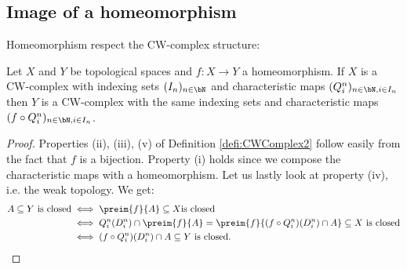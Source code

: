 \subsection{Image of a homeomorphism}

Homeomorphism respect the CW-complex structure: 

\begin{lem} \label{lem:homeomorph}
    Let $X$ and $Y$ be topological spaces and $f \colon X \to Y$ a homeomorphism. 
    If $X$ is a CW-complex with indexing sets $(I_n)_{n \in \bN}$ and characteristic maps $(Q_i^n)_{n \in \bN, i \in I_n}$ then $Y$ is a CW-complex with the same indexing sets and characteristic maps $(f \circ Q_i^n)_{n \in \bN, i \in I_n}$.
\end{lem}
\begin{proof}
    Properties (ii), (iii), (v) of Definition \ref{defi:CWComplex2} follow easily from the fact that $f$ is a bijection. 
    Property (i) holds since we compose the characteristic maps with a homeomorphism. 
    Let us lastly look at property (iv), i.e. the weak topology. 
    We get: 
    \begin{equation*}
        \begin{split}
            A \subseteq Y \text{ is closed} &\iff \preim{f}{A} \subseteq X \text {is closed} \\
            &\iff Q_i^n(D_i^n) \cap \preim{f}{A} = \preim{f}{(f \circ Q_i^n)(D_i^n) \cap A} \subseteq X \text{ is closed} \\ 
            &\iff (f \circ Q_i^n)(D_i^n) \cap A \subseteq Y \text{ is closed}.
        \end{split}
    \end{equation*}
\end{proof}